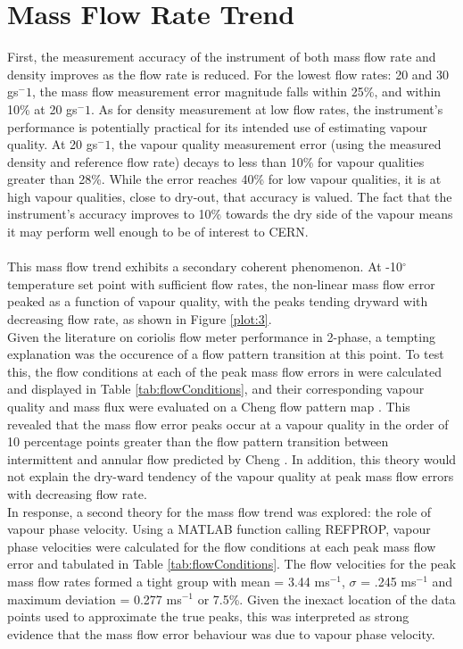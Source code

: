 \documentclass{report}
\begin{document}
\section{Mass Flow Rate Trend}
First, the measurement accuracy of the instrument of both mass flow rate and density improves as the flow rate is reduced. For the lowest flow rates: 20 and 30 gs$^-1$, the mass flow measurement error magnitude falls within 25\%, and within 10\% at 20 gs$^-1$. As for density measurement at low flow rates, the instrument's performance is potentially practical for its intended use of estimating vapour quality. At 20 gs$^-1$, the vapour quality measurement error (using the measured density and reference flow rate)  decays to less than 10\% for vapour qualities greater than 28\%. While the error reaches 40\% for low vapour qualities, it is at high vapour qualities, close to dry-out, that accuracy is valued. The fact that the instrument's accuracy improves to 10\% towards the dry side of the vapour means it may perform well enough to be of interest to CERN.\\
\\
This mass flow trend exhibits a secondary coherent phenomenon. At -10$^\circ$ temperature set point with sufficient flow rates, the non-linear mass flow error peaked as a function of vapour quality, with the peaks tending dryward with decreasing flow rate, as shown in Figure \ref{plot:3}. \\
Given the literature on coriolis flow meter performance in 2-phase, a tempting explanation was the occurence of a flow pattern transition at this point. To test this, the flow conditions at each of the peak mass flow errors in were calculated and displayed in Table \ref{tab:flowConditions}, and their corresponding vapour quality and mass flux were evaluated on a Cheng flow pattern map \cite{Cheng 2008}. This revealed that the mass flow error peaks occur at a vapour quality in the order of 10 percentage points greater than the flow pattern transition between intermittent and annular flow predicted by Cheng \cite{Cheng 2008}. In addition, this theory would not explain the dry-ward tendency of the vapour quality at peak mass flow errors with decreasing flow rate.\\
In response, a second theory for the mass flow trend was explored: the role of vapour phase velocity. Using a MATLAB function calling REFPROP, vapour phase velocities were calculated for the flow conditions at each peak mass flow error and tabulated in Table \ref{tab:flowConditions}. The flow velocities for the peak mass flow rates formed a tight group with mean = 3.44 ms$^{-1}$, $\sigma$ = .245 ms$^{-1}$ and maximum deviation = 0.277 ms$^{-1}$ or 7.5\%. Given the inexact location of the data points used to approximate the true peaks, this was interpreted as strong evidence that the mass flow error behaviour was due to vapour phase velocity. \\
\end{document}
